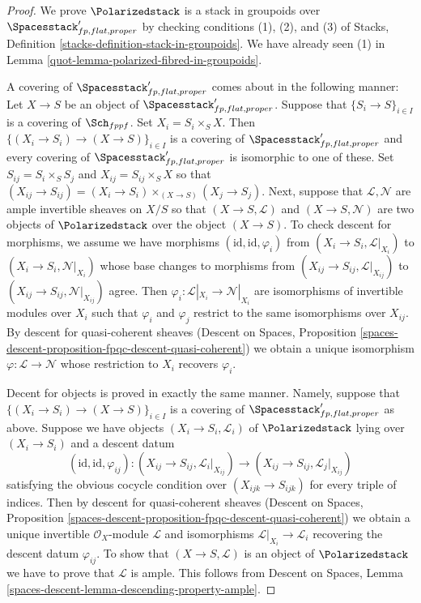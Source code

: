 \begin{proof}

We prove $\Polarizedstack$ is a stack in groupoids over
$\Spacesstack'_{fp, flat, proper}$
by checking conditions (1), (2), and (3)
of Stacks, Definition \ref{stacks-definition-stack-in-groupoids}.
We have already seen (1) in
Lemma \ref{quot-lemma-polarized-fibred-in-groupoids}.

\medskip\noindent
A covering of $\Spacesstack'_{fp, flat, proper}$ comes about
in the following manner: Let $X \to S$ be an object of
$\Spacesstack'_{fp, flat, proper}$. Suppose that
$\{S_i \to S\}_{i \in I}$ is a covering of $\Sch_{fppf}$.
Set $X_i = S_i \times_S X$. Then $\{(X_i \to S_i) \to (X \to S)\}_{i \in I}$
is a covering of $\Spacesstack'_{fp, flat, proper}$ and
every covering of $\Spacesstack'_{fp, flat, proper}$ is isomorphic
to one of these. Set $S_{ij} = S_i \times_S S_j$ and
$X_{ij} = S_{ij} \times_S X$ so that $(X_{ij} \to S_{ij}) =
(X_i \to S_i) \times_{(X \to S)} (X_j \to S_j)$.
Next, suppose that $\mathcal{L}, \mathcal{N}$
are ample invertible sheaves on $X/S$ so that
$(X \to S, \mathcal{L})$ and $(X \to S, \mathcal{N})$
are two objects of $\Polarizedstack$ over the object $(X \to S)$.
To check descent for morphisms, we assume we have morphisms
$(\text{id}, \text{id}, \varphi_i)$ from
$(X_i \to S_i, \mathcal{L}|_{X_i})$ to
$(X_i \to S_i, \mathcal{N}|_{X_i})$
whose base changes to morphisms from
$(X_{ij} \to S_{ij}, \mathcal{L}|_{X_{ij}})$ to
$(X_{ij} \to S_{ij}, \mathcal{N}|_{X_{ij}})$
agree. Then
$\varphi_i : \mathcal{L}|_{X_i} \to \mathcal{N}|_{X_i}$
are isomorphisms of invertible modules over $X_i$ such that
$\varphi_i$ and $\varphi_j$ restrict to the same
isomorphisms over $X_{ij}$.
By descent for quasi-coherent sheaves
(Descent on Spaces, Proposition
\ref{spaces-descent-proposition-fpqc-descent-quasi-coherent})
we obtain a unique isomorphism $\varphi : \mathcal{L} \to \mathcal{N}$
whose restriction to $X_i$ recovers $\varphi_i$.

\medskip\noindent
Decent for objects is proved in exactly the same manner.
Namely, suppose that
$\{(X_i \to S_i) \to (X \to S)\}_{i \in I}$
is a covering of $\Spacesstack'_{fp, flat, proper}$
as above.
Suppose we have objects $(X_i \to S_i, \mathcal{L}_i)$
of $\Polarizedstack$ lying over $(X_i \to S_i)$
and a descent datum
$$
(\text{id}, \text{id}, \varphi_{ij}) :
(X_{ij} \to S_{ij}, \mathcal{L}_i|_{X_{ij}})
\to
(X_{ij} \to S_{ij}, \mathcal{L}_j|_{X_{ij}})
$$
satisfying the obvious cocycle condition over
$(X_{ijk} \to S_{ijk})$ for every triple of indices.
Then by
 descent for quasi-coherent sheaves
(Descent on Spaces, Proposition
\ref{spaces-descent-proposition-fpqc-descent-quasi-coherent})
we obtain a unique invertible $\mathcal{O}_X$-module
$\mathcal{L}$ and isomorphisms $\mathcal{L}|_{X_i} \to \mathcal{L}_i$
recovering the descent datum $\varphi_{ij}$.
To show that
$(X \to S, \mathcal{L})$ is an object of
$\Polarizedstack$ we have to prove that
$\mathcal{L}$ is ample. This follows from
Descent on Spaces, Lemma \ref{spaces-descent-lemma-descending-property-ample}.


\end{proof}
